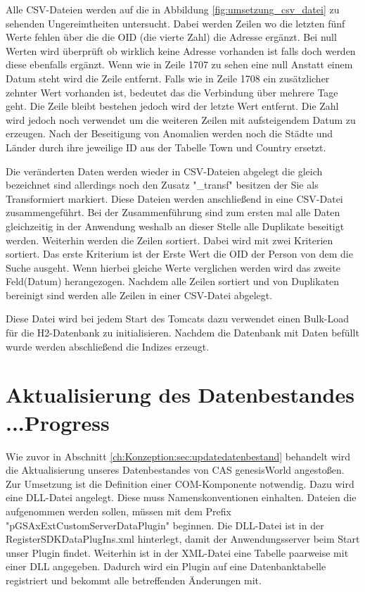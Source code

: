 Alle CSV-Dateien werden auf die in Abbildung \ref{fig:umsetzung_csv_datei} zu sehenden Ungereimtheiten untersucht. Dabei werden Zeilen wo die letzten fünf Werte fehlen über die die OID (die vierte Zahl) die Adresse ergänzt. Bei null Werten wird überprüft ob wirklich keine Adresse vorhanden ist falls doch werden diese ebenfalls ergänzt. Wenn wie in Zeile 1707 zu sehen eine null Anstatt einem Datum steht wird die Zeile entfernt. Falls wie in Zeile 1708 ein zusätzlicher zehnter Wert vorhanden ist, bedeutet das die Verbindung über mehrere Tage geht. Die Zeile bleibt bestehen jedoch wird der letzte Wert entfernt. Die Zahl wird jedoch noch verwendet um die weiteren Zeilen mit aufsteigendem Datum zu erzeugen. Nach der Beseitigung von Anomalien werden noch die Städte und Länder durch ihre jeweilige ID aus der Tabelle Town und Country ersetzt.

Die veränderten Daten werden wieder in CSV-Dateien abgelegt die gleich bezeichnet sind allerdings noch den Zusatz "\_transf" besitzen der Sie als Transformiert  markiert. Diese Dateien werden anschließend in eine CSV-Datei zusammengeführt. Bei der Zusammenführung sind zum ersten mal alle Daten gleichzeitig in der Anwendung weshalb an dieser Stelle alle Duplikate beseitigt werden. Weiterhin werden die Zeilen sortiert. Dabei wird mit zwei Kriterien sortiert. Das erste Kriterium ist der Erste Wert die OID der Person von dem die Suche ausgeht. Wenn hierbei gleiche Werte verglichen werden wird das zweite Feld(Datum) herangezogen. Nachdem alle Zeilen sortiert und von Duplikaten bereinigt sind werden alle Zeilen in einer CSV-Datei abgelegt. 

Diese Datei wird bei jedem Start des Tomcats dazu verwendet einen Bulk-Load für die H2-Datenbank zu initialisieren. Nachdem die Datenbank mit Daten befüllt wurde werden abschließend die Indizes erzeugt.


\section{Aktualisierung des Datenbestandes ...Progress}

Wie zuvor in Abschnitt \ref{ch:Konzeption:sec:updatedatenbestand} behandelt wird die Aktualisierung unseres Datenbestandes von CAS genesisWorld angestoßen. Zur Umsetzung ist die Definition einer COM-Komponente notwendig. Dazu wird eine DLL-Datei angelegt. Diese muss Namenskonventionen einhalten. Dateien die aufgenommen werden sollen, müssen mit dem Prefix "pGSAxExtCustomServerDataPlugin" beginnen. Die DLL-Datei ist in der RegisterSDKDataPlugIns.xml hinterlegt, damit der Anwendungsserver beim Start unser Plugin findet. Weiterhin ist in der XML-Datei eine Tabelle paarweise mit einer DLL angegeben. Dadurch wird ein Plugin auf eine Datenbanktabelle registriert und bekommt alle betreffenden Änderungen mit.

